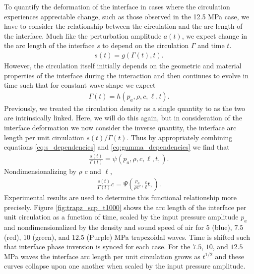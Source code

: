 %
To quantify the deformation of the interface in cases where the
circulation experiences appreciable change, such as those observed in
the 12.5 MPa case, we have to consider the relationship between the
circulation and the arc-length of the interface. Much like the
perturbation amplitude $a(t)$, we expect change in the arc length of
the interface $s$ to depend on the circulation $\Gamma$ and time
$t$.
%
\begin{align}
  \label{eq:s_dependencies}%
  s(t) = g\left(\Gamma(t), t \right).%
\end{align}%
%
However, the circulation itself initially depends on the geometric and
material properties of the interface during the interaction and then
continues to evolve in time such that for constant wave shape we
expect
%
\begin{align}%
  \label{eq:gamma_dependencies}%
  \Gamma(t) = h\left(p_a, \rho, c, \ell, t\right).%
\end{align}%
%
Previously, we treated the circulation density as a single quantity to
as the two are intrinsically linked. Here, we will do this again, but
in consideration of the interface deformation we now consider the
inverse quantity, the interface arc length per unit circulation
$s(t)/\Gamma(t)$. Thus by appropriately combining equations
\eqref{eq:s_dependencies} and \eqref{eq:gamma_dependencies} we find
that
%
\begin{align}%
  \label{eq:scp_dependencies}%
  \frac{s(t)}{\Gamma(t)} = \psi\left(p_a,\rho, c, \ell, t,\right).
\end{align}%
%
Nondimensionalizing by $\rho$ $c$ and $\ell$,
%
\begin{align}%
  \label{eq:scp_dimensionless}%
  \frac{s(t)}{\Gamma(t)} c = \Psi\left(\frac{p_a}{\rho c^2},\frac{c}{\ell}t,\right).%
\end{align}%
%
Experimental results are used to determine this functional
relationship more precisely. Figure \ref{fig:trapz_scp_t1000} shows
the arc length of the interface per unit circulation as a function of
time, scaled by the input pressure amplitude $p_a$ and
nondimensionalized by the density and sound speed of air for $5$
(blue), $7.5$ (red), $10$ (green), and $12.5$ (Purple) MPa trapezoidal
waves. Time is shifted such that interface phase inversion is synced
for each case. For the $7.5$, $10$, and $12.5$ MPa waves the interface
arc length per unit circulation grows as $t^{1/2}$ and these curves
collapse upon one another when scaled by the input pressure
amplitude. 

